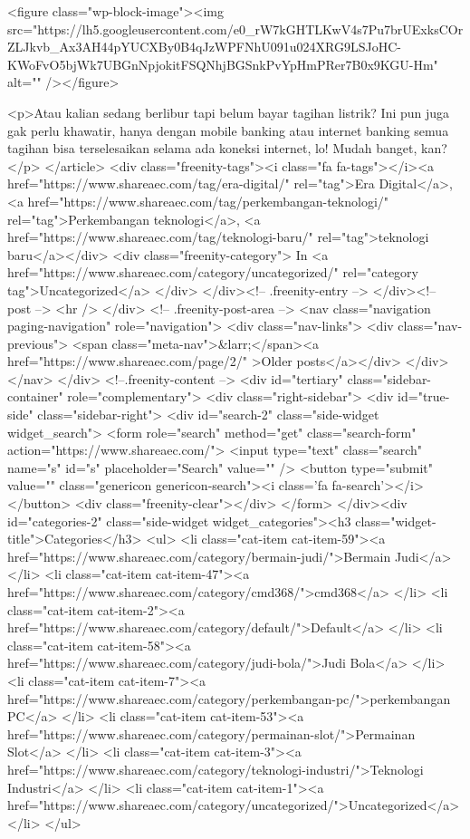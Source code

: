 <figure class="wp-block-image"><img src="https://lh5.googleusercontent.com/e0_rW7kGHTLKwV4s7Pu7brUExksCOrZLJkvb_Ax3AH44pYUCXBy0B4qJzWPFNhU091u024XRG9LSJoHC-KWoFvO5bjWk7UBGnNpjokitFSQNhjBGSnkPvYpHmPRer7B0x9KGU-Hm" alt="" /></figure>



<p>Atau kalian sedang berlibur tapi belum bayar tagihan listrik? Ini pun juga gak perlu khawatir, hanya dengan mobile banking atau internet banking semua tagihan bisa terselesaikan selama ada koneksi internet, lo! Mudah banget, kan?</p>
									</article>
																			<div class="freenity-tags"><i class="fa fa-tags"></i><a href="https://www.shareaec.com/tag/era-digital/" rel="tag">Era Digital</a>, <a href="https://www.shareaec.com/tag/perkembangan-teknologi/" rel="tag">Perkembangan teknologi</a>, <a href="https://www.shareaec.com/tag/teknologi-baru/" rel="tag">teknologi baru</a></div>
																			<div class="freenity-category">
											In <a href="https://www.shareaec.com/category/uncategorized/" rel="category tag">Uncategorized</a>										</div>
																	</div><!-- .freenity-entry -->
							</div><!-- post -->
							<hr />
										</div> <!-- .freenity-post-area -->
					<nav class="navigation paging-navigation" role="navigation">
		<div class="nav-links">
							<div class="nav-previous">
					<span class="meta-nav">&larr;</span><a href="https://www.shareaec.com/page/2/" >Older posts</a></div>
								</div>
	</nav>
			</div> <!--.freenity-content -->
			<div id="tertiary" class="sidebar-container" role="complementary">
	<div class="right-sidebar">
		<div id="true-side" class="sidebar-right">
			<div id="search-2" class="side-widget widget_search">
<form role="search" method="get" class="search-form" action="https://www.shareaec.com/">
	<input type="text" class="search" name="s" id="s" placeholder="Search" value="" />
	<button type="submit" value="" class="genericon genericon-search"><i class='fa fa-search'></i></button>
	<div class="freenity-clear"></div>
</form>
</div><div id="categories-2" class="side-widget widget_categories"><h3 class="widget-title">Categories</h3>
			<ul>
					<li class="cat-item cat-item-59"><a href="https://www.shareaec.com/category/bermain-judi/">Bermain Judi</a>
</li>
	<li class="cat-item cat-item-47"><a href="https://www.shareaec.com/category/cmd368/">cmd368</a>
</li>
	<li class="cat-item cat-item-2"><a href="https://www.shareaec.com/category/default/">Default</a>
</li>
	<li class="cat-item cat-item-58"><a href="https://www.shareaec.com/category/judi-bola/">Judi Bola</a>
</li>
	<li class="cat-item cat-item-7"><a href="https://www.shareaec.com/category/perkembangan-pc/">perkembangan PC</a>
</li>
	<li class="cat-item cat-item-53"><a href="https://www.shareaec.com/category/permainan-slot/">Permainan Slot</a>
</li>
	<li class="cat-item cat-item-3"><a href="https://www.shareaec.com/category/teknologi-industri/">Teknologi Industri</a>
</li>
	<li class="cat-item cat-item-1"><a href="https://www.shareaec.com/category/uncategorized/">Uncategorized</a>
</li>
			</ul>

